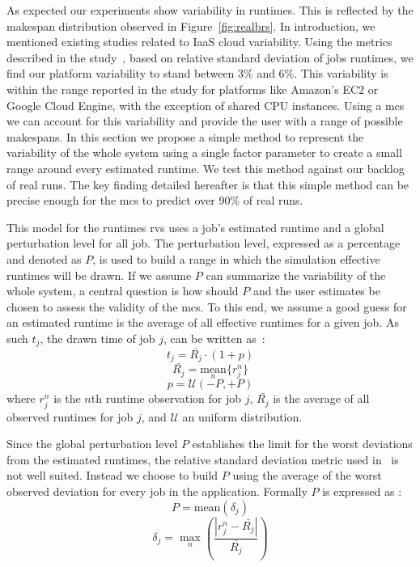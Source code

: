 \documentclass[10pt,conference,compsocconf]{IEEEtran}
\begin{document}
As expected our experiments show variability in runtimes. This is reflected by
the makespan distribution observed in Figure~\ref{fig:realbrs}. In introduction,
we mentioned existing studies related to IaaS cloud variability. Using the
metrics described in the study~\cite{LeitnerC16}, based on relative standard
deviation of jobs runtimes, we find our platform variability to stand between
3\% and 6\%. This variability is within the range reported in the study for
platforms like Amazon's EC2 or Google Cloud Engine, with the exception of shared
CPU instances.
Using a  \ac{mcs} we can account for this  variability and provide the
user with  a range of  possible makespans. In this  section we propose  a simple
method to  represent the variability of  the whole system using  a single factor
parameter to create  a small range around every estimated  runtime. We test this
method against our backlog of real  runs.  The key finding detailed hereafter is
that this simple method  can be precise enough for the  \ac{mcs} to predict over
90\% of real runs.

This model for the runtimes \acp{rv} uses a job's estimated runtime and a global
perturbation  level  for  all  job.   The perturbation  level,  expressed  as  a
percentage and denoted as $P$, is used  to build a range in which the simulation
effective runtimes will be drawn. If we assume $P$ can summarize the variability
of the whole system, a central question is how should $P$ and the user estimates
be chosen to assess the validity of the \ac{mcs}.  To this end, we assume a good
guess for an  estimated runtime is the  average of all effective  runtimes for a
given job. As such $t_j$, the drawn time of job $j$, can be written as~:
\begin{equation}
	t_j = \bar{R_j} \cdot (1 + p)
	\label{eq:t}
\end{equation}
\begin{equation}
	\bar{R_j} = \underset{n}{\textrm{mean}}\{r_j^n\}
\end{equation}
\begin{equation}
	p = \mathcal{U}(-P,+P)
	\label{eq:r}
\end{equation}
where $r_j^n$ is the $n$th runtime observation for job $j$, $\bar{R_j}$ is the
average of all observed runtimes for job $j$, and $\mathcal{U}$ an uniform distribution.

Since the global perturbation level $P$ establishes the limit for the worst
deviations from the estimated runtimes, the relative standard deviation metric
used in~\cite{LeitnerC16} is not well suited. Instead we choose to build $P$
using the average of the worst observed deviation for every job in the
application. Formally $P$ is expressed as :
\begin{equation}
P = \textrm{mean}(\delta{}_j)
\label{eq:P}
\end{equation}
\begin{equation}
\delta{}_j =
\max_n\left(\frac{|r_j^n-\bar{R_j}|}{\bar{R_j}}\right)
\label{eq:d}
\end{equation}
\end{document}
